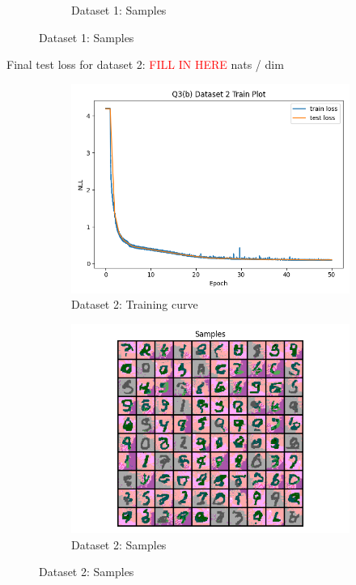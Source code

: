 \documentclass{article}
\begin{document}
\begin{enumerate}[(a)]
\begin{figure}[H]
\begin{subfigure}{0.45\textwidth}
        \caption{Dataset 1: Samples}
    \end{subfigure}
\end{figure}
Final test loss for dataset 2: \textcolor{red}{FILL IN HERE}  nats / dim
\begin{figure}[H]
    \centering
    \begin{subfigure}{0.45\textwidth}
        \centering
        \includegraphics[width=\textwidth]{figures/q3_b_dset2_train_plot.png}
        \caption{Dataset 2: Training curve}
    \end{subfigure}
    \hspace{0.2in}
    \begin{subfigure}{0.45\textwidth}
        \centering
        \includegraphics[width=\textwidth]{figures/q3_b_dset2_samples.png}
        \caption{Dataset 2: Samples}
    \end{subfigure}
\end{figure}


\end{enumerate}
\end{document}
